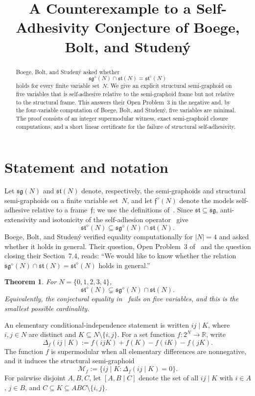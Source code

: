 \documentclass[11pt]{amsart}
\title[Counterexample to a self-adhesivity conjecture]
{A Counterexample to a Self-Adhesivity Conjecture of
Boege, Bolt, and Studen\'y}
\date{}
\newtheorem{theorem}{Theorem}
\newcommand{\sg}{\mathfrak{sg}}
\newcommand{\st}{\mathfrak{st}}
\newcommand{\M}{\mathcal{M}}
\begin{document}
\begin{abstract}
Boege, Bolt, and Studen\'y asked whether
\[
  \sg^{\diamond}(N)\cap\st(N)=\st^{\diamond}(N)
\]
holds for every finite variable set~$N$.
We give an explicit structural semi-graphoid on five variables that is
self-adhesive relative to the semi-graphoid frame but not relative to the
structural frame. This answers their Open Problem~3 in the negative and,
by the four-variable computation of Boege, Bolt, and Studen\'y, five
variables are minimal. The proof consists of an integer supermodular
witness, exact semi-graphoid closure computations, and a short linear
certificate for the failure of structural self-adhesivity.
\end{abstract}

\maketitle

\section{Statement and notation}

Let $\sg(N)$ and $\st(N)$ denote, respectively, the semi-graphoids and
structural semi-graphoids on a finite variable set~$N$, and let
$\mathfrak f^{\diamond}(N)$ denote the models self-adhesive relative to a
frame~$\mathfrak f$; we use the definitions of~\cite{BBS}.
Since $\st\subseteq\sg$, anti-extensivity and isotonicity of the
self-adhesion operator~\cite[Lemma~5.2]{BBS} give
\[
  \st^{\diamond}(N)
  \subseteq \sg^{\diamond}(N)\cap\st(N).
\]
Boege, Bolt, and Studen\'y verified equality computationally for $|N|=4$ and
asked whether it holds in general. Their question, Open Problem~3
of~\cite{BBS} and the question closing their Section~7.4, reads: ``We would
like to know whether the relation
$\sg^{\diamond}(N)\cap\st(N)=\st^{\diamond}(N)$ holds in general.''

\begin{theorem}\label{thm:main}
For $N=\{0,1,2,3,4\}$,
\[
  \st^{\diamond}(N)
  \subsetneq \sg^{\diamond}(N)\cap\st(N).
\]
Equivalently, the conjectural equality in~\cite[Open Problem~3, the question
closing Section~7.4]{BBS} fails on five variables, and this is the smallest
possible cardinality.
\end{theorem}

An elementary conditional-independence statement is written $ij\mid K$,
where $i,j\in N$ are distinct and $K\subseteq N\setminus\{i,j\}$.
For a set function $f\colon 2^N\to\mathbb R$, write
\[
  \Delta_f(ij\mid K)
  :=f(ijK)+f(K)-f(iK)-f(jK).
\]
The function $f$ is supermodular when all elementary differences are
nonnegative, and it induces the structural semi-graphoid
\[
  \M_f:=\{ij\mid K:\Delta_f(ij\mid K)=0\}.
\]
For pairwise disjoint $A,B,C$, let $[A,B\mid C]$ denote the set of all
$ij\mid K$ with $i\in A$, $j\in B$, and
$C\subseteq K\subseteq ABC\setminus\{i,j\}$.
\end{document}
